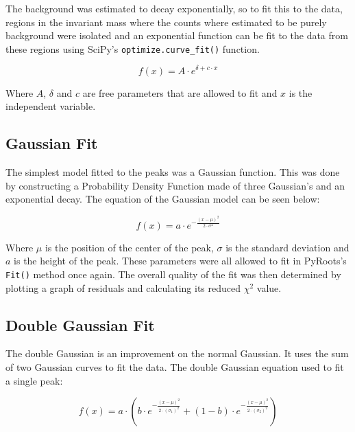 \documentclass[A4sheet,12pt]{article}
\begin{document}
The background was estimated to decay exponentially, so to fit this to the data, regions in the invariant mass where the counts where estimated to be purely background were isolated and an exponential function can be fit to the data from these regions using SciPy's \verb|optimize.curve_fit()| function. 

\begin{equation}
    f(x) = A\cdot e^{\delta + c\cdot x}
\end{equation}

Where $A$, $\delta$ and $c$ are free parameters that are allowed to fit and $x$ is the independent variable. 

\subsection*{Gaussian Fit}

The simplest model fitted to the peaks was a Gaussian function. This was done by constructing a Probability Density Function made of three Gaussian's and an exponential decay. The equation of the Gaussian model can be seen below:

\begin{equation}
    f(x) = a\cdot e^{-\frac{(x-\mu)^2}{2\cdot \sigma^2}}
\end{equation}

Where $\mu$ is the position of the center of the peak, $\sigma$ is the standard deviation and $a$ is the height of the peak. These parameters were all allowed to fit in PyRoots's \verb|Fit()| method once again. The overall quality of the fit was then determined by plotting a graph of residuals and calculating its reduced $\chi ^2$ value.

\subsection*{Double Gaussian Fit}

The double Gaussian is an improvement on the normal Gaussian. It uses the sum of two Gaussian curves to fit the data. The double Gaussian equation used to fit a single peak:

\begin{equation}
    f(x) = a\cdot \left(b\cdot e^{-\frac{(x-\mu)^2}{2\cdot (\sigma_1)^2}} +(1-b)\cdot e^{-\frac{(x-\mu)^2}{2\cdot (\sigma_2)^2}}\right)
\end{equation}
\end{document}
